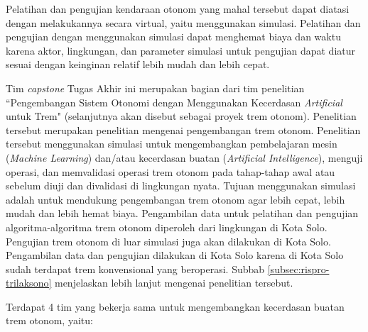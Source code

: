 Pelatihan dan pengujian kendaraan otonom yang mahal tersebut dapat diatasi
dengan melakukannya secara virtual, yaitu menggunakan simulasi. Pelatihan dan
pengujian dengan menggunakan simulasi dapat menghemat biaya dan waktu karena
aktor, lingkungan, dan parameter simulasi untuk pengujian dapat diatur sesuai
dengan keinginan relatif lebih mudah dan lebih cepat.

Tim \textit{capstone} Tugas Akhir ini merupakan bagian dari tim penelitian
``Pengembangan Sistem Otonomi dengan Menggunakan Kecerdasan \textit{Artificial}
untuk Trem" (selanjutnya akan disebut sebagai proyek trem otonom). Penelitian
tersebut merupakan penelitian mengenai pengembangan trem otonom. Penelitian
tersebut menggunakan simulasi untuk mengembangkan pembelajaran mesin
(\textit{Machine Learning}) dan/atau kecerdasan buatan (\textit{Artificial
Intelligence}), menguji operasi, dan memvalidasi operasi trem otonom pada
tahap-tahap awal atau sebelum diuji dan divalidasi di lingkungan nyata. Tujuan
menggunakan simulasi adalah untuk mendukung pengembangan trem otonom agar lebih
cepat, lebih mudah dan lebih hemat biaya. Pengambilan data untuk pelatihan dan
pengujian algoritma-algoritma trem otonom diperoleh dari lingkungan di Kota
Solo. Pengujian trem otonom di luar simulasi juga akan dilakukan di Kota Solo.
Pengambilan data dan pengujian dilakukan di Kota Solo karena di Kota Solo sudah
terdapat trem konvensional yang beroperasi. Subbab
\ref{subsec:rispro-trilaksono} menjelaskan lebih lanjut mengenai penelitian
tersebut.

Terdapat 4 tim yang bekerja sama untuk mengembangkan kecerdasan buatan trem
otonom, yaitu:

